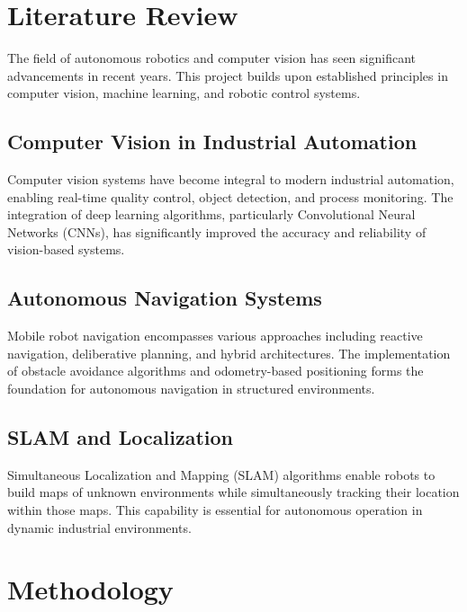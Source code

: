 \documentclass{book}
\begin{document}
\chapter{Literature Review}

\par\noindent The field of autonomous robotics and computer vision has seen significant advancements in recent years. This project builds upon established principles in computer vision, machine learning, and robotic control systems.

\section{Computer Vision in Industrial Automation}

\par\noindent Computer vision systems have become integral to modern industrial automation, enabling real-time quality control, object detection, and process monitoring. The integration of deep learning algorithms, particularly Convolutional Neural Networks (CNNs), has significantly improved the accuracy and reliability of vision-based systems.

\section{Autonomous Navigation Systems}

\par\noindent Mobile robot navigation encompasses various approaches including reactive navigation, deliberative planning, and hybrid architectures. The implementation of obstacle avoidance algorithms and odometry-based positioning forms the foundation for autonomous navigation in structured environments.

\section{SLAM and Localization}

\par\noindent Simultaneous Localization and Mapping (SLAM) algorithms enable robots to build maps of unknown environments while simultaneously tracking their location within those maps. This capability is essential for autonomous operation in dynamic industrial environments.

\chapter{Methodology}
\end{document}
